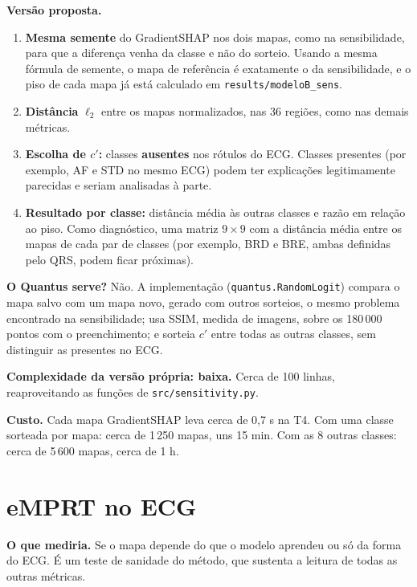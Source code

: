 \documentclass[11pt,a4paper]{article}
\begin{document}
\textbf{Versão proposta.}
\begin{enumerate}
\item \textbf{Mesma semente} do GradientSHAP nos dois mapas, como na sensibilidade, para que a diferença venha da classe e não do sorteio. Usando a mesma fórmula de semente, o mapa de referência é exatamente o da sensibilidade, e o piso de cada mapa já está calculado em \texttt{results/modeloB\_sens}.
\item \textbf{Distância} $\ell_2$ entre os mapas normalizados, nas 36 regiões, como nas demais métricas.
\item \textbf{Escolha de $c'$:} classes \textbf{ausentes} nos rótulos do ECG. Classes presentes (por exemplo, AF e STD no mesmo ECG) podem ter explicações legitimamente parecidas e seriam analisadas à parte.
\item \textbf{Resultado por classe:} distância média às outras classes e razão em relação ao piso. Como diagnóstico, uma matriz $9 \times 9$ com a distância média entre os mapas de cada par de classes (por exemplo, BRD e BRE, ambas definidas pelo QRS, podem ficar próximas).
\end{enumerate}

\textbf{O Quantus serve?} Não. A implementação (\texttt{quantus.RandomLogit}) compara o mapa salvo com um mapa novo, gerado com outros sorteios, o mesmo problema encontrado na sensibilidade; usa SSIM, medida de imagens, sobre os 180\,000 pontos com o preenchimento; e sorteia $c'$ entre todas as outras classes, sem distinguir as presentes no ECG.

\textbf{Complexidade da versão própria: baixa.} Cerca de 100 linhas, reaproveitando as funções de \texttt{src/sensitivity.py}.

\textbf{Custo.} Cada mapa GradientSHAP leva cerca de 0,7 s na T4. Com uma classe sorteada por mapa: cerca de 1\,250 mapas, uns 15 min. Com as 8 outras classes: cerca de 5\,600 mapas, cerca de 1 h.

\section{eMPRT no ECG}
\textbf{O que mediria.} Se o mapa depende do que o modelo aprendeu ou só da forma do ECG. É um teste de sanidade do método, que sustenta a leitura de todas as outras métricas.
\end{document}
